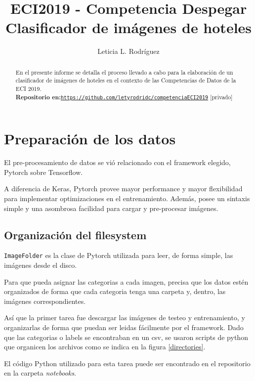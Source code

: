 \documentclass{article}[9pt]
\title{ECI2019 - Competencia Despegar \\ Clasificador de imágenes de hoteles}
\author{
  Leticia L. Rodríguez
}
\begin{document}
\maketitle

\begin{abstract}
En el presente informe se detalla el proceso llevado a cabo para la elaboración de un clasificador de imágenes de hoteles en el contexto de las Competencias de Datos de la ECI 2019. 
\\\textbf{Repositorio en:}\texttt{\url{https://github.com/letyrodridc/competenciaECI2019}} [privado]
\end{abstract}


\section{Preparación de los datos}

El pre-procesamiento de datos se vió relacionado con el framework elegido, Pytorch sobre Tensorflow. 

A diferencia de Keras, Pytorch provee mayor performance y mayor flexibilidad para implementar optimizaciones en el entrenamiento. Además, posee un sintaxis simple y una asombrosa facilidad para cargar y pre-procesar imágenes.


\subsection{Organización del filesystem}

\texttt{ImageFolder} es la clase de Pytorch utilizada para leer, de forma simple, las imágenes desde el disco. 

Para que pueda asignar las categorias a cada imagen, precisa que los datos estén organizados de forma que cada categoria tenga una carpeta y, dentro, las imágenes correspondientes. 

Así que la primer tarea fue descargar las imágenes de testeo y entrenamiento, y organizarlas de forma que puedan ser leidas fácilmente por el framework. Dado que las categorias o labels se encontraban en un csv, se usaron scripts de python que organicen los archivos como se indica en la figura \ref{directories}.

El código Python utilizado para esta tarea puede ser encontrado en el repositorio en la carpeta \textit{notebooks}.
\end{document}
